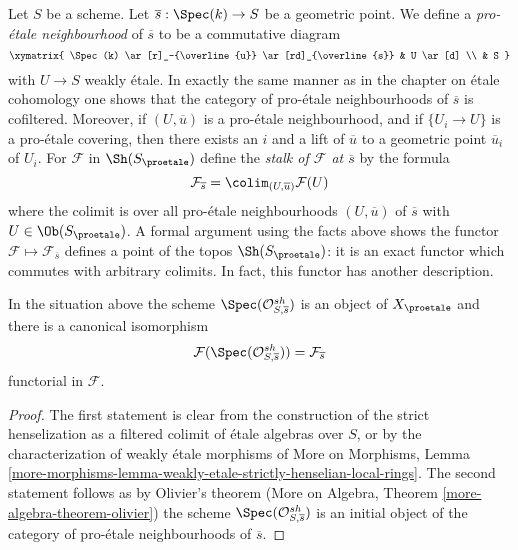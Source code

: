 \noindent
Let $S$ be a scheme. Let $\overline{s} : \Spec(k) \to S$ be a geometric
point. We define a {\it pro-\'etale neighbourhood} of $\overline{s}$
to be a commutative diagram
$$
\xymatrix{
\Spec(k) \ar[r]_-{\overline{u}} \ar[rd]_{\overline{s}} & U \ar[d] \\
& S
}
$$
with $U \to S$ weakly \'etale. In exactly the same manner as in the
chapter on \'etale cohomology one shows that the category of pro-\'etale
neighbourhoods of $\overline{s}$ is cofiltered. Moreover, if
$(U, \overline{u})$ is a pro-\'etale neighbourhood, and if $\{U_i \to U\}$
is a pro-\'etale covering, then there exists an $i$ and a lift of
$\overline{u}$ to a geometric point $\overline{u}_i$ of $U_i$.
For $\mathcal{F}$ in $\Sh(S_\proetale)$ define the {\it stalk
of $\mathcal{F}$ at $\overline{s}$} by the formula
$$
\mathcal{F}_{\overline{s}} = \colim_{(U, \overline{u})} \mathcal{F}(U)
$$
where the colimit is over all pro-\'etale neighbourhoods $(U, \overline{u})$
of $\overline{s}$ with $U \in \Ob(S_\proetale)$.
A formal argument using the facts above shows the functor
$\mathcal{F} \mapsto \mathcal{F}_{\overline{s}}$
defines a point of the topos $\Sh(S_\proetale)$:
it is an exact functor which commutes with arbitrary colimits.
In fact, this functor has another description.

\begin{lemma}
\label{lemma-classical-point}
In the situation above the scheme $\Spec(\mathcal{O}_{S, \overline{s}}^{sh})$
is an object of $X_\proetale$ and there is a canonical isomorphism
$$
\mathcal{F}(\Spec(\mathcal{O}_{S, \overline{s}}^{sh})) =
\mathcal{F}_{\overline{s}}
$$
functorial in $\mathcal{F}$.
\end{lemma}

\begin{proof}
The first statement is clear from the construction of the strict henselization
as a filtered colimit of \'etale algebras over $S$, or by the characterization
of weakly \'etale morphisms of
More on Morphisms, Lemma
\ref{more-morphisms-lemma-weakly-etale-strictly-henselian-local-rings}.
The second statement follows as by Olivier's theorem
(More on Algebra, Theorem \ref{more-algebra-theorem-olivier})
the scheme $\Spec(\mathcal{O}_{S, \overline{s}}^{sh})$
is an initial object of the category of pro-\'etale neighbourhoods
of $\overline{s}$.
\end{proof}

